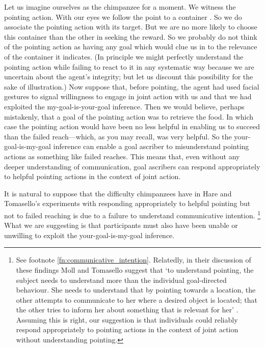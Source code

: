 \documentclass[12pt,a4paper]{extarticle}
\begin{document}
Let us imagine ourselves as the chimpanzee  for a moment.
We witness the pointing action.
With our eyes we follow the point to a container \citep[see][p.\ 6]{Moll:2007gu}.
So we do associate the pointing action with its target.
But we are no more likely to choose this container than the other in seeking the reward.
So we probably do not think of the pointing action as having any goal which would clue us in to the relevance of the container it indicates.
(In principle we might perfectly understand the pointing action while failing to react to it in any systematic way because we are uncertain about the agent's integrity; but let us discount this possibility for the sake of illustration.)
Now suppose 
that, 
before pointing, the agent had used facial gestures to signal willingness to engage in joint action with us
and 
that we had exploited the my-goal-is-your-goal inference.
Then we would believe,
perhaps mistakenly,
that a goal of the pointing action was to retrieve the food.
In which case the pointing action would have been no less helpful in enabling us to succeed than the failed reach---which, as you may recall, was very helpful.
So the your-goal-is-my-goal inference can 
enable a goal ascriber
to  
misunderstand pointing actions as something like  failed reaches.
This means that,
even without any deeper understanding of communication,
goal ascribers can respond appropriately to helpful pointing actions in the context of joint action.


It is natural to suppose that the difficulty chimpanzees have in Hare and Tomasello's experiments with responding appropriately to helpful pointing but not to failed reaching
is due to a failure to understand communicative intention.%
\footnote{
See  footnote \vref{fn:communicative_intention}.
Relatedly,
in their discussion of these findings
Moll and Tomasello suggest that
`to understand pointing, the subject needs to understand more than the individual goal-directed behaviour. 
She needs to understand that by pointing towards a location, the other attempts to communicate to her where a desired object is located; that the other tries to inform her about something that is relevant for her'
\citep[p.\ 6]{Moll:2007gu}.
Assuming this is right, our suggestion is that individuals could reliably  respond  appropriately to pointing actions in the context of joint action without understanding pointing.
}
What we are suggesting is that participants must also have been unable or unwilling to 
exploit the your-goal-is-my-goal inference.
\end{document}
